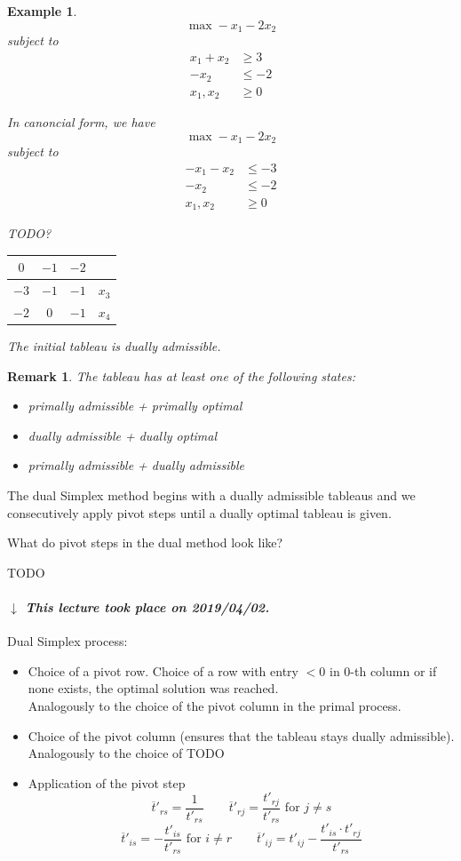 \documentclass[a4paper]{article}
\numberwithin{lecref}{section}
\newcounter{exercises}
\newtheorem{example}[exercises]{Example}
\newtheorem*{Remark}{Remark}
\newcommand{\dateref}[1]{%
  \begin{mdframed}[backgroundcolor=gray!10,innerbottommargin=0pt,innertopmargin=0pt]
    \paragraph{\textit{$\downarrow$ This lecture took place on #1.}}%
  \end{mdframed}%
}
\begin{document}
\begin{example}
	\[ \max -x_1 - 2x_2 \]
	subject to
	\begin{align*}
		x_1 + x_2 &\geq 3 \\
		-x_2 &\leq -2 \\
		x_1, x_2 &\geq 0
	\end{align*}

	In canoncial form, we have
	\[ \max -x_1 - 2x_2 \]
	subject to
	\begin{align*}
		-x_1 - x_2 & \leq -3 \\
		-x_2 & \leq -2 \\
		x_1, x_2 & \geq 0
	\end{align*}

	TODO?

	\begin{center}
		\begin{tabular}{c|ccr}
			$0$ & $-1$ & $-2$ & \\
		\hline
			$-3$ & $-1$ & $-1$ & $x_3$ \\
			$-2$ & $0$ & $-1$  & $x_4$
		\end{tabular}
	\end{center}
	The initial tableau is dually admissible.
\end{example}

\begin{Remark}
	The tableau has at least one of the following states:
	\begin{itemize}
		\item primally admissible + primally optimal
		\item dually admissible + dually optimal
		\item primally admissible + dually admissible
	\end{itemize}
\end{Remark}

The dual Simplex method begins with a dually admissible tableaus and we consecutively apply pivot steps until a dually optimal tableau is given.

What do pivot steps in the dual method look like?

TODO

\dateref{2019/04/02}

Dual Simplex process:
\begin{itemize}
	\item Choice of a pivot row. Choice of a row with entry $< 0$ in 0-th column or if none exists, the optimal solution was reached. \\
		  Analogously to the choice of the pivot column in the primal process.
	\item Choice of the pivot column (ensures that the tableau stays dually admissible). \\
		  Analogously to the choice of TODO
	\item Application of the pivot step
		  \[ \overline{t}'_{rs} = \frac{1}{t'_{rs}} \qquad \overline{t}'_{rj} = \frac{t'_{rj}}{t'_{rs}} \text{ for } j \neq s \]
		  \[ \overline{t}'_{is} = -\frac{t'_{is}}{t'_{rs}} \text{ for } i \neq r \qquad \overline{t}'_{ij} = t'_{ij} - \frac{t'_{is} \cdot t'_{rj}}{t'_{rs}} \]
\end{itemize}
\end{document}
